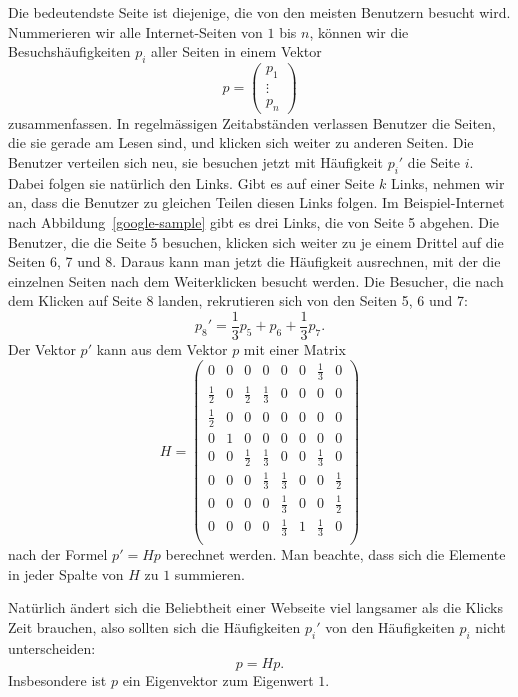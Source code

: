 Die bedeutendste Seite ist diejenige, die von den meisten Benutzern
besucht wird. Nummerieren wir alle Internet-Seiten von $1$ bis $n$,
können wir die Besuchs\-häufigkeiten $p_i$ aller Seiten in einem
Vektor
\[
p=\begin{pmatrix}p_1\\\vdots\\p_n\end{pmatrix}
\]
zusammenfassen. In regelmässigen Zeitabständen verlassen Benutzer
die Seiten, die sie gerade am Lesen sind, und klicken sich weiter zu
anderen Seiten. Die Benutzer verteilen sich neu, sie besuchen jetzt mit
Häufigkeit $p_i'$ die Seite $i$.
Dabei folgen sie natürlich den Links.
Gibt es auf einer Seite $k$ Links, nehmen wir an, dass die Benutzer
zu gleichen Teilen diesen Links folgen.
Im Beispiel-Internet nach Abbildung~\ref{google-sample} gibt es drei
Links, die von Seite 5 abgehen.
Die Benutzer, die die Seite 5
besuchen, klicken sich weiter zu je einem Drittel auf die
Seiten 6, 7 und 8.
Daraus kann man jetzt die Häufigkeit ausrechnen, mit der die
einzelnen Seiten nach dem Weiterklicken besucht werden.
Die Besucher, die nach dem Klicken auf Seite $8$ landen, rekrutieren
sich von den Seiten 5, 6 und 7:
\[
p_8'=\frac13p_5+p_6+\frac13p_7.
\]
Der Vektor $p'$ kann aus dem Vektor $p$ mit einer Matrix
\[
H=\begin{pmatrix}
      0&0&      0&      0&      0&0&\frac13&      0\\
\frac12&0&\frac12&\frac13&      0&0&      0&      0\\
\frac12&0&      0&      0&      0&0&      0&      0\\
      0&1&      0&      0&      0&0&      0&      0\\
      0&0&\frac12&\frac13&      0&0&\frac13&      0\\
      0&0&      0&\frac13&\frac13&0&      0&\frac12\\
      0&0&      0&      0&\frac13&0&      0&\frac12\\
      0&0&      0&      0&\frac13&1&\frac13&0\\
\end{pmatrix}
\]
nach der Formel $p'=Hp$ berechnet werden. Man beachte, dass sich die
Elemente in jeder Spalte von $H$ zu $1$ summieren.

Natürlich ändert sich die Beliebtheit einer Webseite viel langsamer
als die Klicks Zeit brauchen, also sollten sich die Häufigkeiten
$p_i'$ von den Häufigkeiten $p_i$ nicht unterscheiden:
\[
p=Hp.
\]
Insbesondere ist $p$ ein Eigenvektor zum Eigenwert $1$.

